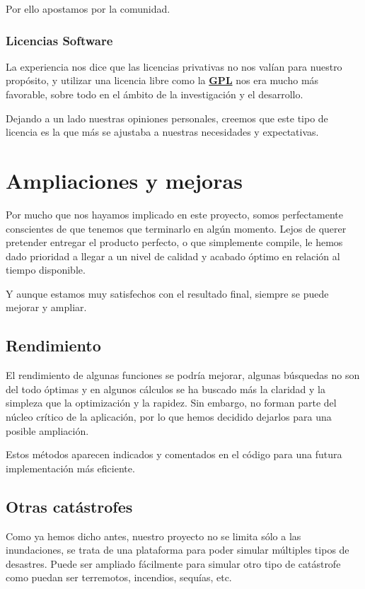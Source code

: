 Por ello apostamos por la comunidad.

\subsubsection{Licencias Software}

La experiencia nos dice que las licencias privativas no nos valían para
nuestro propósito, y utilizar una licencia libre como la \hyperref[ap1]{\bf GPL}
nos era mucho más favorable, sobre todo en el ámbito de la investigación y el
desarrollo.

Dejando a un lado nuestras opiniones personales, creemos que este tipo de
licencia es la que más se ajustaba a nuestras necesidades y expectativas.

\section{Ampliaciones y mejoras}

Por mucho que nos hayamos implicado en este proyecto, somos perfectamente
conscientes de que tenemos que terminarlo en algún momento. Lejos de querer
pretender entregar el producto perfecto, o que simplemente compile, le hemos
dado prioridad a llegar a un nivel de calidad y acabado óptimo en relación al
tiempo disponible.

Y aunque estamos muy satisfechos con el resultado final, siempre se puede
mejorar y ampliar.

\subsection{Rendimiento}

El rendimiento de algunas funciones se podría mejorar, algunas búsquedas no son
del todo óptimas y en algunos cálculos se ha buscado más la claridad y la
simpleza que la optimización y la rapidez. Sin embargo, no forman parte del
núcleo crítico de la aplicación, por lo que hemos decidido dejarlos para una
posible ampliación. 

Estos métodos aparecen indicados y comentados en el código para una futura
implementación más eficiente.

\subsection{Otras catástrofes}

Como ya hemos dicho antes, nuestro proyecto no se limita sólo a las
inundaciones, se trata de una plataforma para poder simular múltiples tipos de
desastres. Puede ser ampliado fácilmente para simular otro tipo de catástrofe
como puedan ser terremotos, incendios, sequías, etc.

